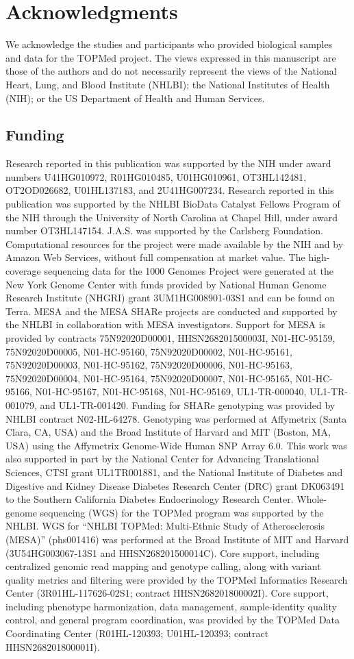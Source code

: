 \documentclass[11pt]{ucscthesis}
\begin{document}
\section{Acknowledgments}
We acknowledge the studies and participants who provided biological samples and data for the TOPMed project.
The views expressed in this manuscript are those of the authors and do not necessarily represent the views of the National Heart, Lung, and Blood Institute (NHLBI); the National Institutes of Health (NIH); or the US Department of Health and Human Services.
\subsection{Funding}
Research reported in this publication was supported by the NIH under award numbers U41HG010972, R01HG010485, U01HG010961, OT3HL142481, OT2OD026682, U01HL137183, and 2U41HG007234.
Research reported in this publication was supported by the NHLBI BioData Catalyst Fellows Program of the NIH through the University of North Carolina at Chapel Hill, under award number OT3HL147154. J.A.S. was supported by the Carlsberg Foundation.
Computational resources for the project were made available by the NIH and by Amazon Web Services, without full compensation at market value.
The high-coverage sequencing data for the 1000 Genomes Project were generated at the New York Genome Center with funds provided by National Human Genome Research Institute (NHGRI) grant 3UM1HG008901-03S1 and can be found on Terra.
MESA and the MESA SHARe projects are conducted and supported by the NHLBI in collaboration with MESA investigators.
Support for MESA is provided by contracts 75N92020D00001, HHSN268201500003I, N01-HC-95159, 75N92020D00005, N01-HC-95160, 75N92020D00002, N01-HC-95161, 75N92020D00003, N01-HC-95162, 75N92020D00006, N01-HC-95163, 75N92020D00004, N01-HC-95164, 75N92020D00007, N01-HC-95165, N01-HC-95166, N01-HC-95167, N01-HC-95168, N01-HC-95169, UL1-TR-000040, UL1-TR-001079, and UL1-TR-001420.
Funding for SHARe genotyping was provided by NHLBI contract N02-HL-64278.
Genotyping was performed at Affymetrix (Santa Clara, CA, USA) and the Broad Institute of Harvard and MIT (Boston, MA, USA) using the Affymetrix Genome-Wide Human SNP Array 6.0.
This work was also supported in part by the National Center for Advancing Translational Sciences, CTSI grant UL1TR001881, and the National Institute of Diabetes and Digestive and Kidney Disease Diabetes Research Center (DRC) grant DK063491 to the Southern California Diabetes Endocrinology Research Center.
Whole-genome sequencing (WGS) for the TOPMed program was supported by the NHLBI.
WGS for “NHLBI TOPMed: Multi-Ethnic Study of Atherosclerosis (MESA)” (phs001416) was performed at the Broad Institute of MIT and Harvard (3U54HG003067-13S1 and HHSN268201500014C).
Core support, including centralized genomic read mapping and genotype calling, along with variant quality metrics and filtering were provided by the TOPMed Informatics Research Center (3R01HL-117626-02S1; contract HHSN268201800002I).
Core support, including phenotype harmonization, data management, sample-identity quality control, and general program coordination, was provided by the TOPMed Data Coordinating Center (R01HL-120393; U01HL-120393; contract HHSN268201800001I).
\end{document}
